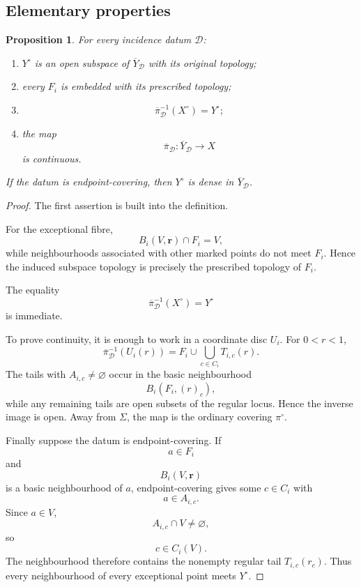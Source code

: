 \documentclass[11pt]{article}
\theoremstyle{plain}
\newtheorem{proposition}[theorem]{Proposition}
\theoremstyle{definition}
\begin{document}
\subsection{Elementary properties}
\label{subsec:incidence-elementary}

\begin{proposition}
\label{prop:incidence-elementary}
For every incidence datum $\mathcal D$:
\begin{enumerate}[label=(\roman*)]
\item $Y^\circ$ is an open subspace of $\overline Y_{\mathcal D}$ with
      its original topology;
\item every $F_i$ is embedded with its prescribed topology;
\item
\[
\overline\pi_{\mathcal D}^{-1}(X^\circ)=Y^\circ;
\]
\item the map
\[
\overline\pi_{\mathcal D}:
\overline Y_{\mathcal D}\to X
\]
is continuous.
\end{enumerate}
If the datum is endpoint-covering, then $Y^\circ$ is dense in
$\overline Y_{\mathcal D}$.
\end{proposition}

\begin{proof}
The first assertion is built into the definition.

For the exceptional fibre,
\[
B_i(V,\mathbf r)\cap F_i=V,
\]
while neighbourhoods associated with other marked points do not meet
$F_i$.  Hence the induced subspace topology is precisely the prescribed
topology of $F_i$.

The equality
\[
\overline\pi_{\mathcal D}^{-1}(X^\circ)=Y^\circ
\]
is immediate.

To prove continuity, it is enough to work in a coordinate disc $U_i$.
For $0<r<1$,
\[
\overline\pi_{\mathcal D}^{-1}(U_i(r))
=
F_i
\cup
\bigcup_{c\in C_i}T_{i,c}(r).
\]
The tails with $A_{i,c}\neq\varnothing$ occur in the basic neighbourhood
\[
B_i(F_i,(r)_c),
\]
while any remaining tails are open subsets of the regular locus.  Hence
the inverse image is open.  Away from $\Sigma$, the map is the ordinary
covering $\pi^\circ$.

Finally suppose the datum is endpoint-covering.  If
\[
a\in F_i
\]
and
\[
B_i(V,\mathbf r)
\]
is a basic neighbourhood of $a$, endpoint-covering gives some $c\in C_i$ with
\[
a\in A_{i,c}.
\]
Since $a\in V$,
\[
A_{i,c}\cap V\neq\varnothing,
\]
so
\[
c\in C_i(V).
\]
The neighbourhood therefore contains the nonempty regular tail
$T_{i,c}(r_c)$.  Thus every neighbourhood of every exceptional point
meets $Y^\circ$.
\end{proof}
\end{document}
